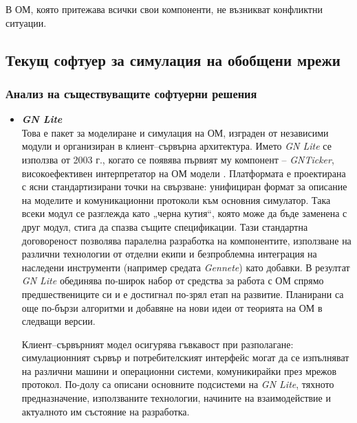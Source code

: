 \begin{Theorem}\label{thm:th}
	В ОМ, която притежава всички свои компоненти, не възникват конфликтни ситуации.
\end{Theorem}



\subsection{Текущ софтуер за симулация на обобщени мрежи}



\subsubsection{Анализ на съществуващите софтуерни решения}

\begin{itemize}
  \item  \textbf{\textit{GN Lite}} \\
Това е пакет за моделиране и симулация на ОМ, изграден от независими модули и организиран в клиент--сървърна архитектура. Името \textit{GN Lite} се използва от 2003 г., когато се появява първият му компонент -- \textit{GNTicker}, високоефективен интерпретатор на ОМ модели \cite{Trifonov2005}. Платформата е проектирана с ясни стандартизирани точки на свързване: унифициран формат за описание на моделите и комуникационни протоколи към основния симулатор. Така всеки модул се разглежда като „черна кутия“, която може да бъде заменена с друг модул, стига да спазва същите спецификации.
Тази стандартна договореност позволява паралелна разработка на компонентите, използване на различни технологии от отделни екипи и безпроблемна интеграция на наследени инструменти (например средата \textit{Gennete}) като добавки. В резултат \textit{GN Lite} обединява по-широк набор от средства за работа с ОМ спрямо предшествениците си и е достигнал по-зрял етап на развитие. Планирани са още по-бързи алгоритми и добавяне на нови идеи от теорията на ОМ в следващи версии.

Клиент--сървърният модел осигурява гъвкавост при разполагане: симулационният сървър и потребителският интерфейс могат да се изпълняват на различни машини и операционни системи, комуникирайки през мрежов протокол. По-долу са описани основните подсистеми на \textit{GN Lite}, тяхното предназначение, използваните технологии, начините на взаимодействие и актуалното им състояние на разработка.



\end{itemize}
